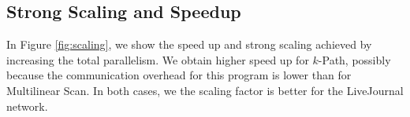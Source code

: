   

\subsection{Strong Scaling and Speedup}
\label{sec:scaling}
In Figure \ref{fig:scaling}, we show the speed up and strong scaling achieved by increasing the total parallelism. We obtain higher speed up for $k$-Path, possibly because the communication overhead for this program is lower than for Multilinear Scan. In both cases, we the scaling factor is better for the LiveJournal network.

